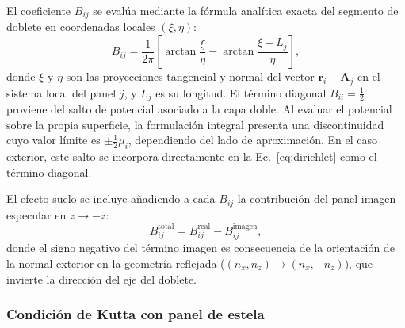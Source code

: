 \documentclass[twocolumn]{article}
\begin{document}
El coeficiente $B_{ij}$ se evalúa mediante la fórmula analítica exacta
del segmento de doblete en coordenadas locales $(\xi,\eta)$:
\begin{equation}
  B_{ij} = \frac{1}{2\pi}
  \left[
    \arctan\!\frac{\xi}{{\eta}} -
    \arctan\!\frac{\xi - L_j}{\eta}
  \right],
  \label{eq:Bij}
\end{equation}
donde $\xi$ y $\eta$ son las proyecciones tangencial y normal del vector
$\mathbf{r}_i - \mathbf{A}_j$ en el sistema local del panel $j$,
y $L_j$ es su longitud. El término diagonal \( B_{ii} = \tfrac{1}{2} \) proviene del salto de potencial asociado a la capa doble. Al evaluar el potencial sobre la propia superficie, la formulación integral presenta una discontinuidad cuyo valor límite es \( \pm \tfrac{1}{2}\mu_i \), dependiendo del lado de aproximación. En el caso exterior, este salto se incorpora directamente en la Ec.~\eqref{eq:dirichlet} como el término diagonal.

El efecto suelo se incluye añadiendo a cada $B_{ij}$ la contribución
del panel imagen especular en $z \to -z$:
\begin{equation}
  B_{ij}^\text{total} = B_{ij}^\text{real} - B_{ij}^\text{imagen},
  \label{eq:Bij_total}
\end{equation}
donde el signo negativo del término imagen es consecuencia de la
orientación de la normal exterior en la geometría reflejada
($(n_x, n_z) \to (n_x, -n_z)$), que invierte la dirección del
eje del doblete.

\subsubsection{Condición de Kutta con panel de estela}
\end{document}
